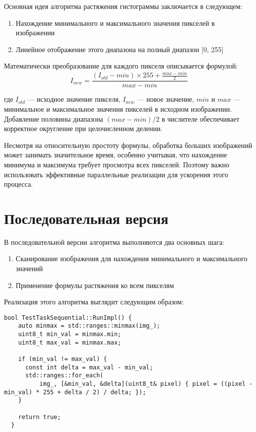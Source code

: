 \documentclass[a4paper,14pt]{article}
\begin{document}
Основная идея алгоритма растяжения гистограммы заключается в следующем:
\begin{enumerate}
    \item Нахождение минимального и максимального значения пикселей в изображении
    \item Линейное отображение этого диапазона на полный диапазон [0, 255]
\end{enumerate}

Математически преобразование для каждого пикселя описывается формулой:
\begin{equation}
I_{new} = \frac{(I_{old} - min) \times 255 + \frac{max - min}{2}}{max - min}
\end{equation}

где $I_{old}$ — исходное значение пикселя, $I_{new}$ — новое значение, $min$ и $max$ — минимальное и максимальное значения пикселей в исходном изображении. Добавление половины диапазона $(max - min)/2$ в числителе обеспечивает корректное округление при целочисленном делении.

Несмотря на относительную простоту формулы, обработка больших изображений может занимать значительное время, особенно учитывая, что нахождение минимума и максимума требует просмотра всех пикселей. Поэтому важно использовать эффективные параллельные реализации для ускорения этого процесса.

\section{Последовательная версия}

В последовательной версии алгоритма выполняются два основных шага:

\begin{enumerate}
    \item Сканирование изображения для нахождения минимального и максимального значений
    \item Применение формулы растяжения ко всем пикселям
\end{enumerate}

Реализация этого алгоритма выглядит следующим образом:

\begin{lstlisting}[caption=Последовательная реализация растяжения гистограммы]
bool TestTaskSequential::RunImpl() {
    auto minmax = std::ranges::minmax(img_);
    uint8_t min_val = minmax.min;
    uint8_t max_val = minmax.max;
  
    if (min_val != max_val) {
      const int delta = max_val - min_val;
      std::ranges::for_each(
          img_, [&min_val, &delta](uint8_t& pixel) { pixel = ((pixel - min_val) * 255 + delta / 2) / delta; });
    }
  
    return true;
  }
\end{lstlisting}
\end{document}

